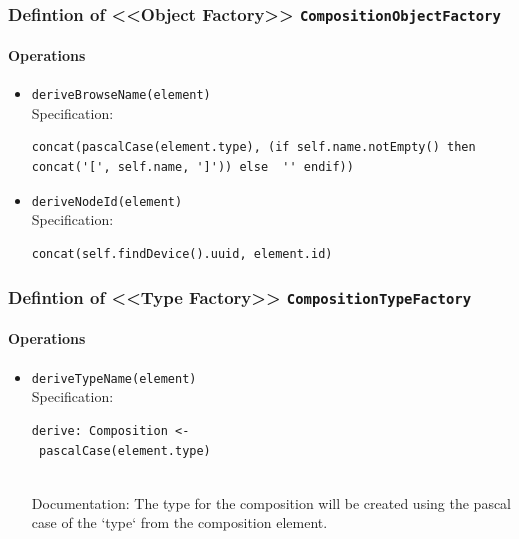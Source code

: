 \subsubsection{Defintion of <<Object Factory>> \texttt{CompositionObjectFactory}} \label{type:CompositionObjectFactory}

\FloatBarrier



\paragraph{Operations}
\begin{itemize}
  \item \texttt{deriveBrowseName(element)}\\
    Specification:
   \indent \begin{Verbatim}[xleftmargin=.25in,fontsize=\small]
concat(pascalCase(element.type), (if self.name.notEmpty() then concat('[', self.name, ']')) else  '' endif))
\end{Verbatim}

  \item \texttt{deriveNodeId(element)}\\
    Specification:
   \indent \begin{Verbatim}[xleftmargin=.25in,fontsize=\small]
concat(self.findDevice().uuid, element.id)
\end{Verbatim}

\end{itemize}
\subsubsection{Defintion of <<Type Factory>> \texttt{CompositionTypeFactory}} \label{type:CompositionTypeFactory}

\FloatBarrier



\paragraph{Operations}
\begin{itemize}
  \item \texttt{deriveTypeName(element)}\\
    Specification:
   \indent \begin{Verbatim}[xleftmargin=.25in,fontsize=\small]
derive: Composition <-
 pascalCase(element.type)
\end{Verbatim}
\\
    Documentation: The type for the composition will be created using the pascal case of the `type` from the composition element.

\end{itemize}
